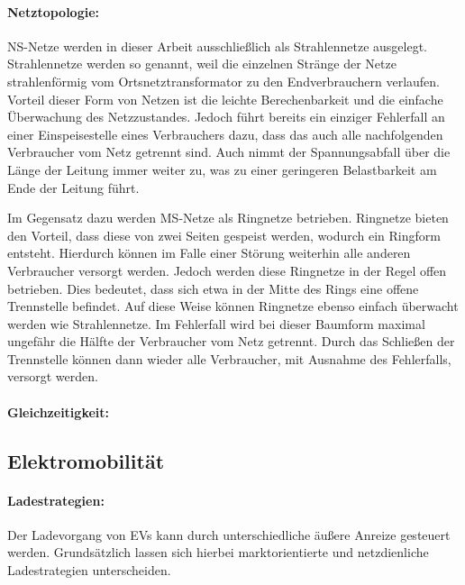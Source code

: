 


\paragraph{Netztopologie:}

\gls{NS}-Netze werden in dieser Arbeit ausschließlich als Strahlennetze ausgelegt.
Strahlennetze werden so genannt, weil die einzelnen Stränge der Netze strahlenförmig vom Ortsnetztransformator zu den Endverbrauchern verlaufen. \cite{Agora2019}
Vorteil dieser Form von Netzen ist die leichte Berechenbarkeit und die einfache Überwachung des Netzzustandes.
Jedoch führt bereits ein einziger Fehlerfall an einer Einspeisestelle eines Verbrauchers dazu, dass das auch alle nachfolgenden Verbraucher vom Netz getrennt sind.
Auch nimmt der Spannungsabfall über die Länge der Leitung immer weiter zu, was zu einer geringeren Belastbarkeit am Ende der Leitung führt. \cite{WNG2020}\medskip

Im Gegensatz dazu werden \gls{MS}-Netze als Ringnetze betrieben.
Ringnetze bieten den Vorteil, dass diese von zwei Seiten gespeist werden, wodurch ein Ringform entsteht.
Hierdurch können im Falle einer Störung weiterhin alle anderen Verbraucher versorgt werden.
Jedoch werden diese Ringnetze in der Regel offen betrieben.
Dies bedeutet, dass sich etwa in der Mitte des Rings eine offene Trennstelle befindet.
Auf diese Weise können Ringnetze ebenso einfach überwacht werden wie Strahlennetze.
Im Fehlerfall wird bei dieser Baumform maximal ungefähr die Hälfte der Verbraucher vom Netz getrennt.
Durch das Schließen der Trennstelle können dann wieder alle Verbraucher, mit Ausnahme des Fehlerfalls, versorgt werden. \cite{WNG2020} \cite{Westermann2019}

\paragraph{Gleichzeitigkeit:}

\subsection{Elektromobilität}

\paragraph{Ladestrategien:}

Der Ladevorgang von \glspl{EV} kann durch unterschiedliche äußere Anreize gesteuert werden. Grundsätzlich lassen sich hierbei marktorientierte und netzdienliche Ladestrategien unterscheiden.


